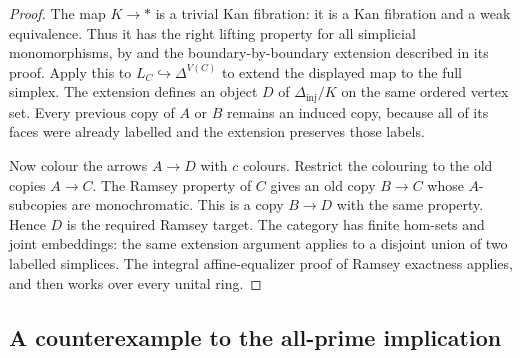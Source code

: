 \begin{proof}
The map $K\to *$ is a trivial Kan fibration: it is a Kan fibration
and a weak equivalence. Thus it has the right lifting property for
all simplicial monomorphisms, by
\citet[Theorem I.7.10, pp.~32--35]{ABGoerssJardine} and the
boundary-by-boundary extension described in its proof. Apply this to
$L_C\hookrightarrow\Delta^{V(C)}$ to extend the displayed map to the
full simplex. The extension defines an object $D$ of
$\Delta_{\mathrm{inj}}/K$ on the same ordered vertex set. Every
previous copy of $A$ or $B$ remains an induced copy, because all of
its faces were already labelled and the extension preserves those
labels.

Now colour the arrows $A\to D$ with $c$ colours. Restrict the
colouring to the old copies $A\to C$. The Ramsey property of $C$
gives an old copy $B\to C$ whose $A$-subcopies are monochromatic.
This is a copy $B\to D$ with the same property. Hence $D$ is the
required Ramsey target. The category has finite hom-sets and joint
embeddings: the same extension argument applies to a disjoint union
of two labelled simplices. The integral affine-equalizer proof of
Ramsey exactness applies, and then works over every unital ring.
\end{proof}

\subsection{A counterexample to the all-prime implication}

